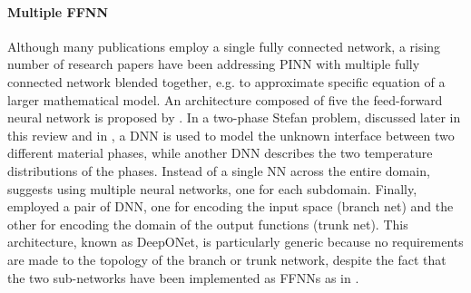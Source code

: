\documentclass[pdflatex,sn-basic]{sn-jnl}%
\theoremstyle{thmstyleone}%
\theoremstyle{thmstyletwo}%
\theoremstyle{thmstylethree}%
\begin{document}





\paragraph{Multiple FFNN}  %
Although many publications employ a single fully connected network, a rising number of research papers have been addressing PINN with multiple fully connected network blended together, e.g. to approximate 
specific equation of a larger mathematical model.
An architecture composed of five the feed-forward neural network is proposed by \cite{Hag2021_PhysicsInformedDeep_RaiHRM}.
In a two-phase Stefan problem, discussed later in this review and in \cite{Cai2021_PhysicsInformedNeural_WanCWW},
a DNN is used to model the unknown interface between two different material phases, while another DNN describes the two temperature distributions of the phases.
Instead of a single NN across the entire domain, \cite{Mos2021_FiniteBasisPhysics_MarMMN} suggests using multiple neural networks, one for each subdomain.
%
Finally, \cite{Lu2021_LearningNonlinearOperators_JinLJP} employed a pair of DNN, one for encoding the input space (branch net) and the other for encoding the domain of the output functions (trunk net).
This architecture, known as DeepONet, is particularly generic because no requirements are made to the topology of the branch or trunk network, despite the fact that the two sub-networks have been implemented as FFNNs as in \cite{Lin2021_SeamlessMultiscaleOperator_MaxLMLK}. 
\end{document}
